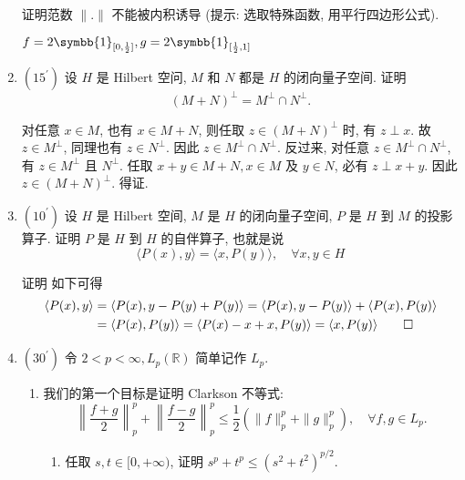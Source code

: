 \begin{enumerate}
\[    \]
    证明范数 $\|.\|$ 不能被内积诱导 (提示: 选取特殊函数, 用平行四边形公式).
        \begin{answer}
            $f= 2\symbb{1}_{[0,\frac{1}{2}]}, g=2\symbb{1}_{[\frac{1}{2},1]}$
        \end{answer}
    \item $\left(15^{\prime}\right)$ 设 $H$ 是 Hilbert 空问, $M$ 和 $N$ 都是 $H$ 的闭向量子空间. 证明
    \[
    (M+N)^{\perp}=M^{\perp} \cap N^{\perp} .
    \]
        \begin{answer}
            对任意 $x \in M$, 也有 $x \in M+N$, 则任取 $z \in(M+N)^{\perp}$ 时, 有 $z \perp x$. 故 $z \in M^{\perp}$, 同理也有 $z \in N^{\perp}$. 因此 $z \in M^{\perp} \cap N^{\perp}$.
            反过来, 对任意 $z \in M^{\perp} \cap N^{\perp}$, 有 $z \in M^{\perp}$ 且 $N^{\perp}$. 任取 $x+y \in M+N, x \in M$ 及 $y \in N$, 必有 $z \perp x+y$. 因此 $z \in(M+N)^{\perp}$. 得证.
        \end{answer}
    \item $\left(10^{\prime}\right)$ 设 $H$ 是 Hilbert 空间, $M$ 是 $H$ 的闭向量子空间, $P$ 是 $H$ 到 $M$ 的投影算子. 证明 $P$ 是 $H$ 到 $H$ 的自伴算子, 也就是说
    \[
    \langle P(x), y\rangle=\langle x, P(y)\rangle, \quad \forall x, y \in H
    \]
        \begin{answer}
            证明 如下可得
            \[
                \begin{aligned}
                \langle P(x), y\rangle &=\langle P(x), y-P(y)+P(y)\rangle=\langle P(x), y-P(y)\rangle+\langle P(x), P(y)\rangle \\
                &=\langle P(x), P(y)\rangle=\langle P(x)-x+x, P(y)\rangle=\langle x, P(y)\rangle \qedhere
                \end{aligned}
            \]
        \end{answer}
    \item $\left(30^{\prime}\right)$ 
    令 $2<p<\infty, L_{p}(\mathbb{R})$ 简单记作 $L_{p}$.
        \begin{enumerate}
            \item 我们的第一个目标是证明 Clarkson 不等式:
            \[
                \left\|\frac{f+g}{2}\right\|_{p}^{p}+\left\|\frac{f-g}{2}\right\|_{p}^{p} \leq \frac{1}{2}\left(\|f\|_{p}^{p}+\|g\|_{p}^{p}\right), \quad \forall f, g \in L_{p} .
            \]
                \begin{enumerate}
                    \item 任取 $s, t \in[0,+\infty)$, 证明 $s^{p}+t^{p} \leq\left(s^{2}+t^{2}\right)^{p / 2}$.

\end{enumerate}
\end{enumerate}
\end{enumerate}
